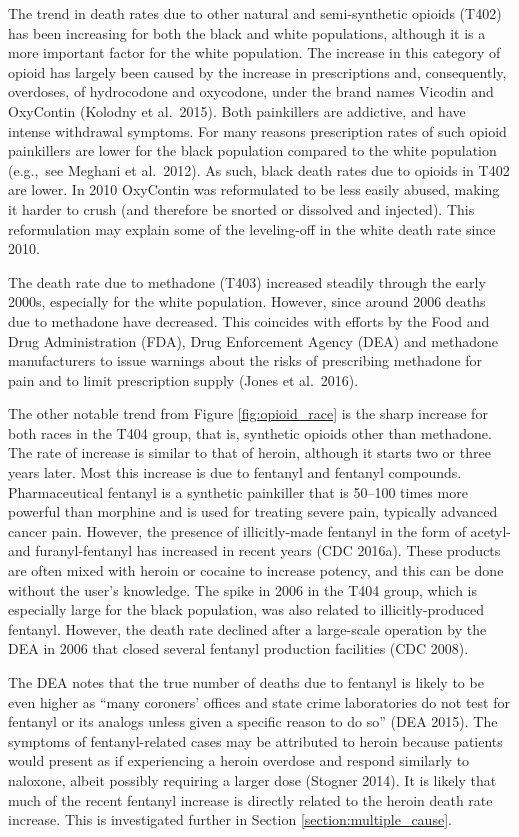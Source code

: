 \documentclass[12pt, a4paper]{article}
\begin{document}
The trend in death rates due to other natural and semi-synthetic opioids (T402) has been increasing for both the black and white populations, although it is a more important factor for the white population. The increase in this category of opioid has largely been caused by the increase in prescriptions and, consequently, overdoses, of hydrocodone and oxycodone, under the brand names Vicodin and OxyContin (Kolodny et al.\ 2015). Both painkillers are addictive, and have intense withdrawal symptoms. For many reasons prescription rates of such opioid painkillers are lower for the black population compared to the white population (e.g.,\ see Meghani et al.\ 2012). As such, black death rates due to opioids in T402 are lower. In 2010 OxyContin was reformulated to be less easily abused, making it harder to crush (and therefore be snorted or dissolved and injected). This reformulation may explain some of the leveling-off in the white death rate since 2010. 

The death rate due to methadone (T403) increased steadily through the early 2000s, especially for the white population. However, since around 2006 deaths due to methadone have decreased. This coincides with efforts by the Food and Drug Administration (FDA), Drug Enforcement Agency (DEA) and methadone manufacturers to issue warnings about the risks of prescribing methadone for pain and to limit prescription supply (Jones et al.\ 2016).

The other notable trend from Figure \ref{fig:opioid_race} is the sharp increase for both races in the T404 group, that is, synthetic opioids other than methadone. The rate of increase is similar to that of heroin, although it starts two or three years later. Most this increase is due to fentanyl and fentanyl compounds. Pharmaceutical fentanyl is a synthetic painkiller that is 50--100 times more powerful than morphine and is used for treating severe pain, typically advanced cancer pain. However, the presence of illicitly-made fentanyl in the form of acetyl- and furanyl-fentanyl has increased in recent years (CDC 2016a). These products are often mixed with heroin or cocaine to increase potency, and this can be done without the user's knowledge. The spike in 2006 in the T404 group, which is especially large for the black population, was also related to illicitly-produced fentanyl. However, the death rate declined after a large-scale operation by the DEA in 2006 that closed several fentanyl production facilities (CDC 2008).

The DEA notes that the true number of deaths due to fentanyl is likely to be even higher as ``many coroners' offices and state crime laboratories do not test for fentanyl or its analogs unless given a specific reason to do so'' (DEA 2015). The symptoms of fentanyl-related cases may be attributed to heroin because patients would present as if experiencing a heroin overdose and respond similarly to naloxone, albeit possibly requiring a larger dose (Stogner 2014). It is likely that much of the recent fentanyl increase is directly related to the heroin death rate increase. This is investigated further in Section \ref{section:multiple_cause}.
\end{document}

